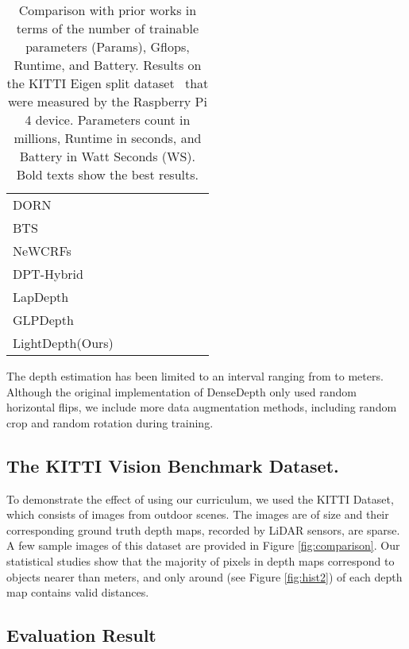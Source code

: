 \documentclass{article}
\begin{document}
\begin{table*}[t]
\caption{Comparison with prior works in terms of the number of trainable parameters (Params), Gflops, Runtime, and Battery. Results on the KITTI Eigen split dataset~\cite{eigen} that were measured by the Raspberry Pi 4 device.  Parameters count in millions, Runtime in seconds, and Battery in Watt Seconds (WS). Bold texts show the best results.} 
\label{tab:params}
    \begin{center}
    \begin{tabular}{lccccccc}
     &  &  &  &   \\ 
    \hline
    DORN~\cite{dorn}  &  &  &  & \\ 
    BTS~\cite{bts}  &  &  &  &  \\
NeWCRFs~\cite{2new}  &   &  &  &  \\
    DPT-Hybrid~\cite{8dpt} &  &  &  &  \\
    LapDepth~\cite{7lap} &   &  &  &  \\
    GLPDepth~\cite{5glp} &   &  &  &  \\
    LightDepth(Ours) &  &    &  &   \\
    \hline
    \end{tabular}
    \end{center}
\end{table*}


The depth estimation has been limited to an interval ranging from  to  meters. Although the original implementation of DenseDepth only used random horizontal flips, we include more data augmentation methods, including random crop and random rotation during training.


\subsection{The KITTI Vision Benchmark Dataset.} To demonstrate the effect of using our curriculum, we used the KITTI Dataset, ~\cite{geiger2013vision} which consists of  images from  outdoor scenes. The images are of size  and their corresponding ground truth depth maps, recorded by LiDAR sensors, are sparse. A few sample images of this dataset are provided in Figure \ref{fig:comparison}. Our statistical studies show that the majority of pixels in depth maps correspond to objects nearer than  meters, and only around  (see Figure \ref{fig:hist2}) of each depth map contains valid distances.
 


\subsection{Evaluation Result}
\end{document}
